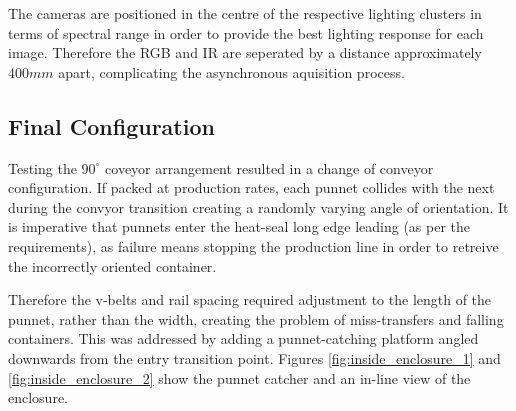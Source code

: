 \documentclass[fleqn,twoside]{article}
\begin{document}
The cameras are positioned in the centre of the respective lighting clusters in terms of spectral range in order to provide the best lighting response for each image. Therefore the RGB and IR are seperated by a distance approximately $400mm$ apart, complicating the asynchronous aquisition process.







\subsection{Final Configuration}


Testing the $90^{\circ}$ coveyor arrangement resulted in a change of conveyor configuration. If packed at production rates, each punnet collides with the next during the convyor transition creating a randomly varying angle of orientation. It is imperative that punnets enter the heat-seal long edge leading (as per the requirements), as failure means stopping the production line in order to retreive the incorrectly oriented container.

Therefore the v-belts and rail spacing required adjustment to the length of the punnet, rather than the width, creating the problem of miss-transfers and falling containers. This was addressed by adding a punnet-catching platform angled downwards from the entry transition point. Figures \ref{fig:inside_enclosure_1} and \ref{fig:inside_enclosure_2} show the punnet catcher and an in-line view of the enclosure.
\end{document}
